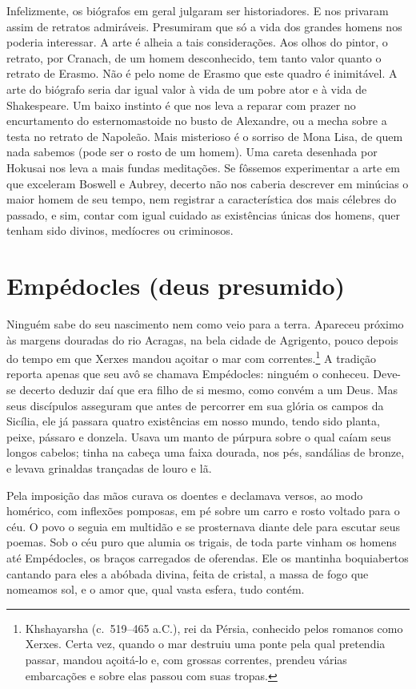 Infelizmente, os biógrafos em geral julgaram ser historiadores. E
nos privaram assim de retratos admiráveis. Presumiram que só a vida dos
grandes homens nos poderia interessar. A arte é alheia a tais
considerações. Aos olhos do pintor, o retrato, por Cranach, de um homem
desconhecido, tem tanto valor quanto o retrato de Erasmo. Não é pelo nome
de Erasmo que este quadro é inimitável. A arte do biógrafo seria dar igual \label{vida}
valor à vida de um pobre ator e à vida de Shakespeare. Um baixo instinto é
que nos leva a reparar com prazer no encurtamento do esternomastoide no
busto de Alexandre, ou a mecha sobre a testa no retrato de Napoleão. Mais
misterioso é o sorriso de Mona Lisa, de quem nada sabemos (pode ser o
rosto de um homem). Uma careta desenhada por Hokusai nos leva a mais
fundas meditações. Se fôssemos experimentar a arte em que exceleram
Boswell e Aubrey, decerto não nos caberia descrever em minúcias o maior
homem de seu tempo, nem registrar a característica dos mais célebres do
passado, e sim, contar com igual cuidado as existências únicas
dos homens, quer tenham sido divinos, medíocres ou criminosos.


\chapter{Empédocles (deus presumido)}

Ninguém sabe do seu nascimento nem como veio para a terra. Apareceu próximo
às margens douradas do rio Acragas, na bela cidade de Agrigento, pouco
depois do tempo em que Xerxes mandou açoitar o mar com
correntes.\footnote{ Khshayarsha  (c.~519--465 a.C.), 
rei da Pérsia, conhecido pelos romanos como Xerxes. Certa vez,
quando o mar destruiu uma ponte pela qual pretendia passar, mandou
açoitá-lo e, com grossas correntes, prendeu várias embarcações e sobre
elas passou com suas tropas.} A tradição reporta apenas que seu
avô se chamava Empédocles: ninguém o conheceu. Deve-se decerto deduzir daí
que era filho de si mesmo, como convém a um Deus. Mas seus discípulos
asseguram que antes de percorrer em sua glória os campos da Sicília, ele
já passara quatro existências em nosso mundo, tendo sido planta, peixe,
pássaro e donzela. Usava um manto de púrpura sobre o qual caíam seus
longos cabelos; tinha na cabeça uma faixa dourada, nos pés, sandálias de
bronze, e levava grinaldas trançadas de louro e lã.

Pela imposição das mãos curava os doentes e declamava versos, ao modo
homérico, com inflexões pomposas, em pé sobre um carro e rosto voltado
para o céu. O povo o seguia em multidão e se prosternava diante dele para
escutar seus poemas. Sob o céu puro que alumia os trigais, de toda parte
vinham os homens até Empédocles, os braços carregados de oferendas. Ele os
mantinha boquiabertos cantando para eles a abóbada divina, feita de
cristal, a massa de fogo que nomeamos sol, e o amor que, qual vasta
esfera, tudo contém.


